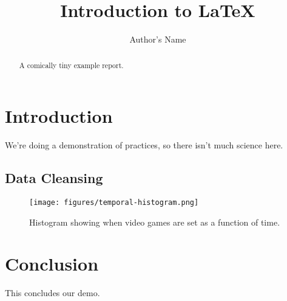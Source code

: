 \documentclass{article}
\begin{document}
\title{Introduction to \LaTeX{}}
\author{Author's Name}

\maketitle

\begin{abstract}
A comically tiny example report.
\end{abstract}

\section{Introduction}

We're doing a demonstration of practices, so there isn't much science here.


\subsection{Data Cleansing}



\begin{figure}
    \centering
    \texttt{[image: figures/temporal-histogram.png]}
    \caption{Histogram showing when video games are set as a function of time.}
    \label{temphist}
\end{figure}

\section{Conclusion}
This concludes our demo.
\end{document}
